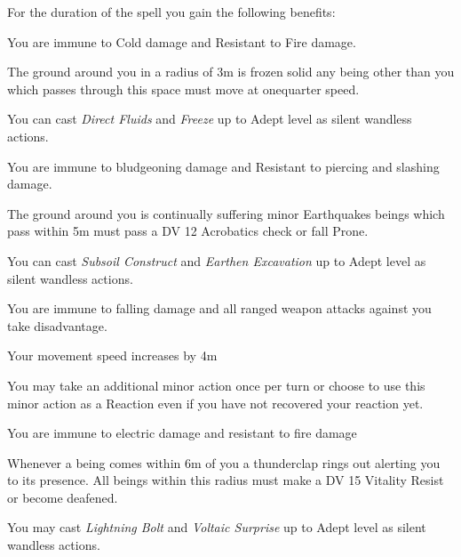 \begin{multicols}{3}
{For the duration of the spell\comma{} you gain the following benefits:


{
\item You are immune to Cold damage and Resistant to Fire damage. 
\item The ground around you in a radius of 3m is frozen solid\comma{} any being other than you which passes through this space must move at one\minus{}quarter speed. 
\item You can cast {\it Direct Fluids} and {\it Freeze} up to Adept level as silent\comma{} wandless actions. 
}

{
\item You are immune to bludgeoning damage and Resistant to piercing and slashing damage.
\item The ground around you is continually suffering minor Earthquakes\comma{} beings which pass within 5m must pass a DV 12 Acrobatics check or fall Prone. 
\item You can cast {\it Subsoil Construct} and {\it Earthen Excavation} up to Adept level as silent\comma{} wandless actions. 
}

{
\item You are immune to falling damage and all ranged weapon attacks against you take disadvantage. 
\item Your movement speed increases by 4m 
\item You may take an additional minor action once per turn\comma{} or choose to use this minor action as a Reaction even if you have not recovered your reaction yet. 
}

{
\item You are immune to electric damage and resistant to fire damage
\item Whenever a being comes within 6m of you\comma{} a thunderclap rings out\comma{} alerting you to its presence. All beings within this radius must make a DV 15 Vitality Resist\comma{} or become deafened. 
\item You may cast {\it Lightning Bolt} and {\it Voltaic Surprise} up to Adept level as silent\comma{} wandless actions. 
}

}
\end{multicols}
